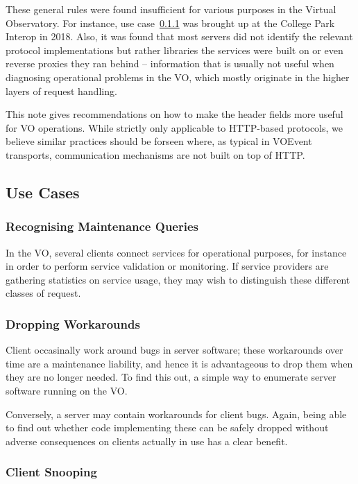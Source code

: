 \documentclass[11pt,a4paper]{ivoa}
\begin{document}
These general rules were found insufficient for various purposes in the
Virtual Observatory.  For instance, use case~\ref{uc:stats} was brought
up at the College Park Interop in 2018.  Also, it was found that most
servers did not identify the relevant protocol implementations but
rather libraries the services were built on or even reverse proxies they
ran behind -- information that is usually not useful when diagnosing
operational problems in the VO, which mostly originate in the higher
layers of request handling.

This note gives recommendations on how to make the header fields more
useful for VO operations.  While strictly only applicable to HTTP-based
protocols, we believe similar practices should be forseen where, as
typical in VOEvent transports, communication mechanisms are not built on
top of HTTP.


\subsection{Use Cases}

\subsubsection{Recognising Maintenance Queries}
\label{uc:stats}

In the VO, several clients connect services for operational purposes,
for instance in order to perform service validation or monitoring. If
service providers are gathering statistics on service usage, they may
wish to distinguish these different classes of request.

\subsubsection{Dropping Workarounds}

Client occasinally work around bugs in server software; these
workarounds over time are a maintenance liability, and hence it is
advantageous to drop them when they are no longer needed.  To find this
out, a simple way to enumerate server software running on the VO.

Conversely, a server may contain workarounds for client bugs.  Again,
being able to find out whether code implementing these can be safely
dropped without adverse consequences on clients actually in use has a
clear benefit.

\subsubsection{Client Snooping}
\end{document}
